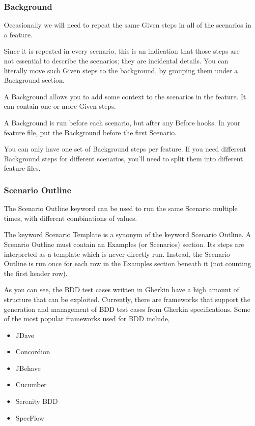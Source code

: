 \documentclass[conference, onecolumn, a4, 12pt]{IEEEtran}
\begin{document}
\subsubsection{Background}
Occasionally we will need to repeat the same Given steps in all of the scenarios in a feature.

Since it is repeated in every scenario, this is an indication that those steps are not essential to describe the scenarios; they are incidental details. You can literally move such Given steps to the background, by grouping them under a Background section.

A Background allows you to add some context to the scenarios in the feature. It can contain one or more Given steps.

A Background is run before each scenario, but after any Before hooks. In your feature file, put the Background before the first Scenario.

You can only have one set of Background steps per feature. If you need different Background steps for different scenarios, you’ll need to split them into different feature files.\cite{a1}

\subsubsection{Scenario Outline}
The Scenario Outline keyword can be used to run the same Scenario multiple times, with different combinations of values.

The keyword Scenario Template is a synonym of the keyword Scenario Outline.
A Scenario Outline must contain an Examples (or Scenarios) section. Its steps are interpreted as a template which is never directly run. Instead, the Scenario Outline is run once for each row in the Examples section beneath it (not counting the first header row).\cite{a1}\newline

As you can see, the BDD test cases written in Gherkin have a high amount of structure that can be exploited. Currently, there are frameworks that support the generation and management of BDD test cases from Gherkin specifications. Some of the most popular frameworks used for BDD include,

\begin{itemize}
	\item JDave 
	\item Concordion 
	\item JBehave 
	\item Cucumber
	\item Serenity BDD
	\item SpecFlow   
\end{itemize}
\end{document}
